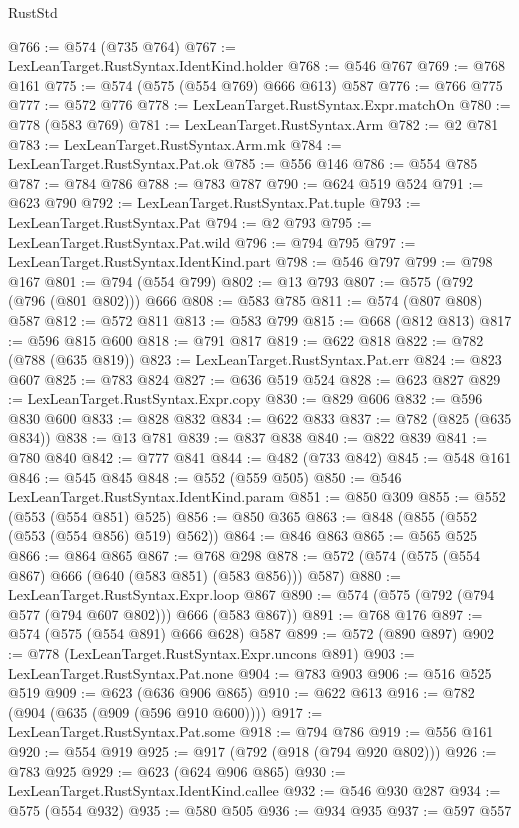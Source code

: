 \begin{lexlean}{RustStd}
\begin{coremodule}
@766 := @574 (@735 @764)
@767 := LexLeanTarget.RustSyntax.IdentKind.holder
@768 := @546 @767
@769 := @768 @161
@775 := @574 (@575 (@554 @769) @666 @613) @587
@776 := @766 @775
@777 := @572 @776
@778 := LexLeanTarget.RustSyntax.Expr.matchOn
@780 := @778 (@583 @769)
@781 := LexLeanTarget.RustSyntax.Arm
@782 := @2 @781
@783 := LexLeanTarget.RustSyntax.Arm.mk
@784 := LexLeanTarget.RustSyntax.Pat.ok
@785 := @556 @146
@786 := @554 @785
@787 := @784 @786
@788 := @783 @787
@790 := @624 @519 @524
@791 := @623 @790
@792 := LexLeanTarget.RustSyntax.Pat.tuple
@793 := LexLeanTarget.RustSyntax.Pat
@794 := @2 @793
@795 := LexLeanTarget.RustSyntax.Pat.wild
@796 := @794 @795
@797 := LexLeanTarget.RustSyntax.IdentKind.part
@798 := @546 @797
@799 := @798 @167
@801 := @794 (@554 @799)
@802 := @13 @793
@807 := @575 (@792 (@796 (@801 @802))) @666
@808 := @583 @785
@811 := @574 (@807 @808) @587
@812 := @572 @811
@813 := @583 @799
@815 := @668 (@812 @813)
@817 := @596 @815 @600
@818 := @791 @817
@819 := @622 @818
@822 := @782 (@788 (@635 @819))
@823 := LexLeanTarget.RustSyntax.Pat.err
@824 := @823 @607
@825 := @783 @824
@827 := @636 @519 @524
@828 := @623 @827
@829 := LexLeanTarget.RustSyntax.Expr.copy
@830 := @829 @606
@832 := @596 @830 @600
@833 := @828 @832
@834 := @622 @833
@837 := @782 (@825 (@635 @834))
@838 := @13 @781
@839 := @837 @838
@840 := @822 @839
@841 := @780 @840
@842 := @777 @841
@844 := @482 (@733 @842)
@845 := @548 @161
@846 := @545 @845
@848 := @552 (@559 @505)
@850 := @546 LexLeanTarget.RustSyntax.IdentKind.param
@851 := @850 @309
@855 := @552 (@553 (@554 @851) @525)
@856 := @850 @365
@863 := @848 (@855 (@552 (@553 (@554 @856) @519) @562))
@864 := @846 @863
@865 := @565 @525
@866 := @864 @865
@867 := @768 @298
@878 := @572 (@574 (@575 (@554 @867) @666 (@640 (@583 @851) (@583 @856))) @587)
@880 := LexLeanTarget.RustSyntax.Expr.loop @867
@890 := @574 (@575 (@792 (@794 @577 (@794 @607 @802))) @666 (@583 @867))
@891 := @768 @176
@897 := @574 (@575 (@554 @891) @666 @628) @587
@899 := @572 (@890 @897)
@902 := @778 (LexLeanTarget.RustSyntax.Expr.uncons @891)
@903 := LexLeanTarget.RustSyntax.Pat.none
@904 := @783 @903
@906 := @516 @525 @519
@909 := @623 (@636 @906 @865)
@910 := @622 @613
@916 := @782 (@904 (@635 (@909 (@596 @910 @600))))
@917 := LexLeanTarget.RustSyntax.Pat.some
@918 := @794 @786
@919 := @556 @161
@920 := @554 @919
@925 := @917 (@792 (@918 (@794 @920 @802)))
@926 := @783 @925
@929 := @623 (@624 @906 @865)
@930 := LexLeanTarget.RustSyntax.IdentKind.callee
@932 := @546 @930 @287
@934 := @575 (@554 @932)
@935 := @580 @505
@936 := @934 @935
@937 := @597 @557

\end{coremodule}
\end{lexlean}
